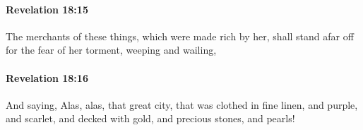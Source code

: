 		\paragraph{Revelation 18:15} %
			\label{REVELATIONNT-18-15}

			The merchants of these things, which were made rich by her, shall stand afar off for the fear of her torment, weeping and wailing,

			\begin{framed}
			\scriptsize
				\begin{compactdesc}
					\item[SBLG] 
				\end{compactdesc}
			\end{framed}

		\paragraph{Revelation 18:16} %
			\label{REVELATIONNT-18-16}

			And saying, Alas, alas, that great city, that was clothed in fine linen, and purple, and scarlet, and decked with gold, and precious stones, and pearls!

